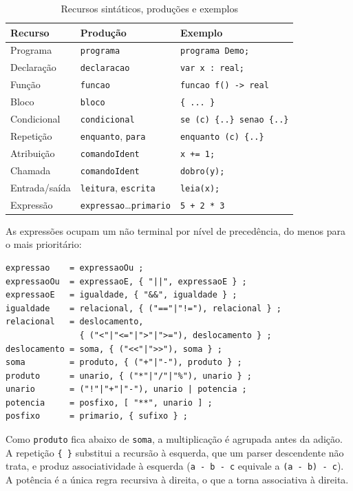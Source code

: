 \documentclass[conference,a4paper]{IEEEtran}
\newcommand{\cod}[1]{\texttt{#1}}
\begin{document}
\begin{table}[t]
\caption{Recursos sintáticos, produções e exemplos}
\label{tab:sintaxe}
\centering
\scriptsize
\begin{tabular}{@{}lll@{}}
\toprule
Recurso & Produção & Exemplo \\
\midrule
Programa & \cod{programa} & \cod{programa Demo;} \\
Declaração & \cod{declaracao} & \cod{var x : real;} \\
Função & \cod{funcao} & \cod{funcao f() -> real} \\
Bloco & \cod{bloco} & \cod{\{ ... \}} \\
Condicional & \cod{condicional} & \cod{se (c) \{..\} senao \{..\}} \\
Repetição & \cod{enquanto}, \cod{para} & \cod{enquanto (c) \{..\}} \\
Atribuição & \cod{comandoIdent} & \cod{x += 1;} \\
Chamada & \cod{comandoIdent} & \cod{dobro(y);} \\
Entrada/saída & \cod{leitura}, \cod{escrita} & \cod{leia(x);} \\
Expressão & \cod{expressao}\ldots\cod{primario} & \cod{5 + 2 * 3} \\
\bottomrule
\end{tabular}
\end{table}

As expressões ocupam um não terminal por nível de precedência, do menos para o mais prioritário:
\begin{lstlisting}[basicstyle=\ttfamily\scriptsize]
expressao    = expressaoOu ;
expressaoOu  = expressaoE, { "||", expressaoE } ;
expressaoE   = igualdade, { "&&", igualdade } ;
igualdade    = relacional, { ("=="|"!="), relacional } ;
relacional   = deslocamento,
               { ("<"|"<="|">"|">="), deslocamento } ;
deslocamento = soma, { ("<<"|">>"), soma } ;
soma         = produto, { ("+"|"-"), produto } ;
produto      = unario, { ("*"|"/"|"%"), unario } ;
unario       = ("!"|"+"|"-"), unario | potencia ;
potencia     = posfixo, [ "**", unario ] ;
posfixo      = primario, { sufixo } ;
\end{lstlisting}
Como \cod{produto} fica abaixo de \cod{soma}, a multiplicação é agrupada antes da adição. A repetição \cod{\{ \}} substitui a recursão à esquerda, que um parser descendente não trata, e produz associatividade à esquerda (\cod{a - b - c} equivale a \cod{(a - b) - c}). A potência é a única regra recursiva à direita, o que a torna associativa à direita.
\end{document}

